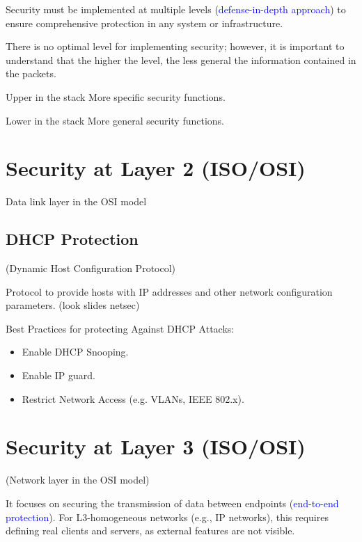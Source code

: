\begin{center}
    Security must be implemented at multiple levels (\textcolor{Blue}{defense-in-depth approach}) to ensure comprehensive protection in any system or infrastructure.
\end{center}
\hfill 

There is no optimal level for implementing security; however, it is important to understand that the higher the level, the less general the information contained in the packets.

\begin{tcolorbox}[colback=lightblue, colframe=blue!50!white]
    Upper in the stack \textrightarrow More specific security functions.
    
    Lower in the stack \textrightarrow More general security functions.
\end{tcolorbox}

\section{Security at Layer 2 (ISO/OSI)}
\begin{center}
Data link layer in the OSI model
\end{center}
\begin{center}
    \subsection{DHCP Protection}
\end{center}

\begin{center}
    (Dynamic Host Configuration Protocol)
\end{center}
Protocol to provide hosts with IP addresses and other network configuration parameters.
(look slides netsec)

Best Practices for protecting Against DHCP Attacks:
\begin{itemize}
    \item Enable DHCP Snooping.
    \item Enable IP guard.
    \item Restrict Network Access (e.g. VLANs, IEEE 802.x).
\end{itemize}

\clearpage
\section{Security at Layer 3 (ISO/OSI)}
\begin{center}
(Network layer in the OSI model)
    
\end{center}
It focuses on securing the transmission of data between endpoints (\textcolor{Blue}{end-to-end protection}). For L3-homogeneous networks (e.g., IP networks), this requires defining real clients and servers, as external features are not visible.

